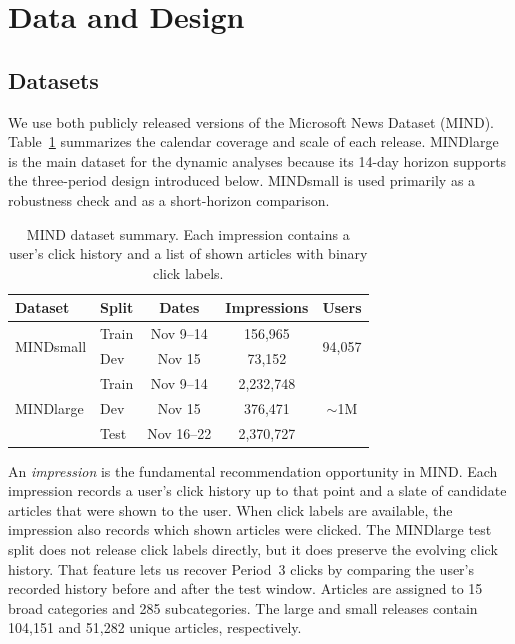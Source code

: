\documentclass[11pt]{article}
\begin{document}
\section{Data and Design}
\label{sec:data}

\subsection{Datasets}

We use both publicly released versions of the Microsoft News Dataset (MIND). Table~\ref{tab:datasets} summarizes the calendar coverage and scale of each release. MINDlarge is the main dataset for the dynamic analyses because its 14-day horizon supports the three-period design introduced below. MINDsmall is used primarily as a robustness check and as a short-horizon comparison.

\begin{table}[ht]
\centering
\caption{MIND dataset summary. Each impression contains a user's click history and a list of shown articles with binary click labels.}
\label{tab:datasets}
\begin{tabular}{llccc}
\toprule
Dataset & Split & Dates & Impressions & Users \\
\midrule
\multirow{2}{*}{MINDsmall} & Train & Nov 9--14 & 156,965 & \multirow{2}{*}{94,057} \\
 & Dev & Nov 15 & 73,152 & \\
\midrule
\multirow{3}{*}{MINDlarge} & Train & Nov 9--14 & 2,232,748 & \multirow{3}{*}{${\sim}$1M} \\
 & Dev & Nov 15 & 376,471 & \\
 & Test & Nov 16--22 & 2,370,727 & \\
\bottomrule
\end{tabular}
\end{table}
\FloatBarrier

An \emph{impression} is the fundamental recommendation opportunity in MIND. Each impression records a user's click history up to that point and a slate of candidate articles that were shown to the user. When click labels are available, the impression also records which shown articles were clicked. The MINDlarge test split does not release click labels directly, but it does preserve the evolving click history. That feature lets us recover Period~3 clicks by comparing the user's recorded history before and after the test window. Articles are assigned to 15 broad categories and 285 subcategories. The large and small releases contain 104,151 and 51,282 unique articles, respectively.
\end{document}
